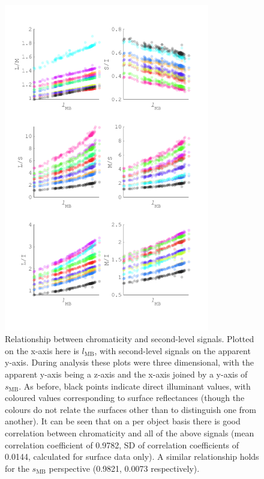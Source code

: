 \begin{figure}
\includegraphics[max width=0.8\textwidth]{figs/comp/predictingChromaticity/allComboSignals.pdf}
\caption{Relationship between chromaticity and second-level signals. Plotted on the x-axis here is $l_{\text{MB}}$, with second-level signals on the apparent y-axis. During analysis these plots were three dimensional, with the apparent y-axis being a z-axis and the x-axis joined by a y-axis of $s_{\text{MB}}$. As before, black points indicate direct illuminant values, with coloured values corresponding to surface reflectances (though the colours do not relate the surfaces other than to distinguish one from another). It can be seen that on a per object basis there is good correlation between chromaticity and all of the above signals (mean correlation coefficient of 0.9782, SD of correlation coefficients of 0.0144, calculated for surface data only). A similar relationship holds for the $s_{\text{MB}}$ perspective (0.9821, 0.0073 respectively).}
\label{fig:allComboSignals}
\end{figure}

